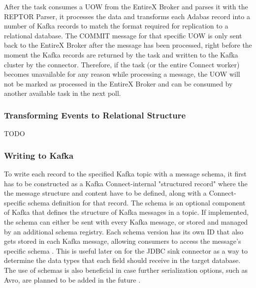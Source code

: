After the task consumes a \ac{UOW} from the EntireX Broker and parses it with the \ac{REPTOR} Parser, it processes the data and transforms each Adabas record into a number of Kafka records to match the format required for replication to a relational database. The COMMIT message for that specific \ac{UOW} is only sent back to the EntireX Broker after the message has been processed, right before the moment the Kafka records are returned by the task and written to the Kafka cluster by the connector. Therefore, if the task (or the entire Connect worker) becomes unavailable for any reason while processing a message, the \ac{UOW} will not be marked as processed in the EntireX Broker and can be consumed by another available task in the next poll.

\subsubsection{Transforming Events to Relational Structure}
\label{ch04:pipelinedevelopment:implementation:transformingtorelational}
TODO

\subsubsection{Writing to Kafka} 
To write each record to the specified Kafka topic with a message schema, it first has to be constructed as a Kafka Connect-internal "structured record" where the the message structure and content have to be defined, along with a Connect-specific schema definition for that record. The schema is an optional component of Kafka that defines the structure of Kafka messages in a topic. If implemented, the schema can either be sent with every Kafka message, or stored and managed by an additional schema registry. Each schema version has its own ID that also gets stored in each Kafka message, allowing consumers to access the message's specific schema \cite{kafkadatabaseinverted}. This is useful later on for the \ac{JDBC} sink connector as a way to determine the data types that each field should receive in the target database. The use of schemas is also beneficial in case further serialization options, such as Avro, are planned to be added in the future \cite{kreps2011kafka}.


